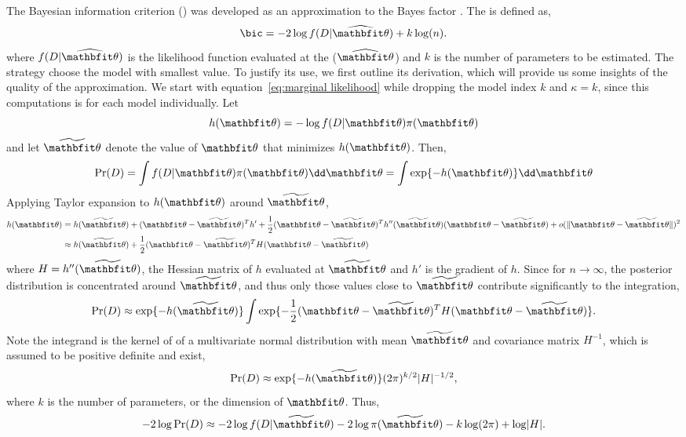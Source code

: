 The Bayesian information criterion (\bic) was developed as an approximation to
the Bayes factor \parencite{Schwarz1978}. The \bic is defined as,
\begin{equation}
  \text{\bic} = -2\log f(D|\hbth) + k\log(n).
\end{equation}
where $f(D|\hbth)$ is the likelihood function evaluated at the \mle ($\hbth$)
and $k$ is the number of parameters to be estimated. The \bic strategy choose
the model with smallest \bic value. To justify its use, we first outline its
derivation, which will provide us some insights of the quality of the
approximation. We start with equation~\eqref{eq:marginal likelihood} while
dropping the model index $k$ and $\kappa=k$, since this computations is for
each model individually. Let
\begin{equation}
  h(\bth) = - \log f(D|\bth)\pi(\bth)
\end{equation}
and let $\tbth$ denote the value of $\bth$ that minimizes $h(\bth)$. Then,
\begin{equation}
  \Pr(D) = \int f(D|\bth)\pi(\bth)\dd\bth = \int\exp\{-h(\bth)\}\dd\bth
\end{equation}
Applying Taylor expansion to $h(\bth)$ around $\tbth$,
\begin{align}
  h(\bth)
  &= h(\tbth) + (\bth - \tbth)^T h'
  + \frac{1}{2}(\bth - \tbth)^T h''(\tbth) (\bth - \tbth)
  + o(\lVert \bth - \tbth \rVert)^2 \notag\\
  &\approx h(\tbth) + \frac{1}{2}(\bth - \tbth)^T H (\bth - \tbth)
\end{align}
where $H = h''(\tbth)$, the Hessian matrix of $h$ evaluated at $\tbth$ and
$h'$ is the gradient of $h$. Since for $n\to\infty$, the posterior
distribution is concentrated around $\tbth$, and thus only those values close
to $\tbth$ contribute significantly to the integration,
\begin{equation}
  \Pr(D)\approx\exp\{-h(\tbth)\}
  \int\exp\{-\frac{1}{2}(\bth - \tbth)^TH(\bth - \tbth)\}.
\end{equation}
Note the integrand is the kernel of of a multivariate normal distribution with
mean $\tbth$ and covariance matrix $H^{-1}$, which is assumed to be positive
definite and exist,
\begin{equation}
  \Pr(D) \approx \exp\{-h(\tbth)\} (2\pi)^{k/2} \lvert H \rvert^{-1/2},
\end{equation}
where $k$ is the number of parameters, or the dimension of $\bth$. Thus,
\begin{equation}
  -2\log\Pr(D) \approx
  -2\log f(D|\tbth) - 2\log\pi(\tbth) - k\log(2\pi) + \log\lvert H \rvert.
  \label{eq:bic approx}
\end{equation}
